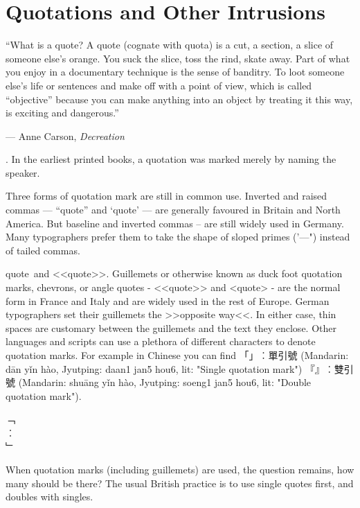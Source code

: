 \chapter{Quotations and Other Intrusions}
\normalfont

\epigraph{“What is a quote? A quote (cognate with quota) is a cut, a section, a slice of someone else’s orange. You suck the slice, toss the rind, skate away. Part of what you enjoy in a documentary technique is the sense of banditry. To loot someone else’s life or sentences and make off with a point of view, which is called “objective” because you can make anything into an object by treating it this way, is exciting and dangerous.”}{--- Anne Carson, \textit{Decreation}}

. In the earliest printed books, a quotation was marked merely by naming the speaker.

Three forms of quotation mark are still in common use. Inverted and raised commas --- ``quote'' and
`quote' --- are generally favoured in Britain and North America. But baseline and inverted commas --
are still widely used in Germany. Many typographers prefer them to take the shape of
sloped primes ('---") instead of tailed commas. 

\DescribeMacro{\guillemotleft}
\DescribeMacro{\guillemotright}
\guillemotleft quote\guillemotright\ and <<quote>>. Guillemets or otherwise known as duck foot quotation marks, chevrons, or angle quotes - <<quote>> and <quote> - are the normal form in France and Italy and are widely used in the rest of Europe. German typographers set their guillemets the 
>>opposite way<<. In either case, thin spaces are customary between the guillemets and the text they enclose. Other languages and scripts can use a plethora of different characters to denote quotation marks. For example in Chinese you can find {\arial 「」︰單引號 (Mandarin: dān yǐn hào, Jyutping: daan1 jan5 hou6, lit: "Single quotation mark")
『』︰雙引號 (Mandarin: shuāng yǐn hào, Jyutping: soeng1 jan5 hou6, lit: "Double quotation mark"}). 

\bgroup
\LARGE
\noindent\arial
﹁\\
︰\\
﹂\\
\egroup

When quotation marks (including guillemets) are used, the question remains, how many should be there?
The usual British practice is to use single quotes first, and doubles with singles.


